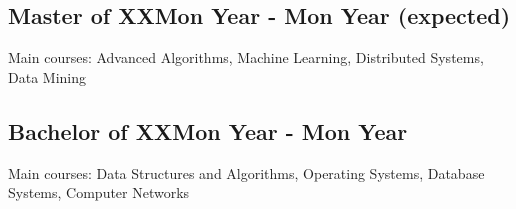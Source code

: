 \vspace*{10pt}
\subsection {{Master of XX}\hfill Mon Year - Mon Year (expected)}
\vspace*{5pt}
Main courses: Advanced Algorithms, Machine Learning, Distributed Systems, Data Mining \\

\vspace*{6pt}
\subsection{{Bachelor of XX}\hfill Mon Year - Mon Year}
\vspace*{5pt}
Main courses: Data Structures and Algorithms, Operating Systems, Database Systems, Computer Networks \\

